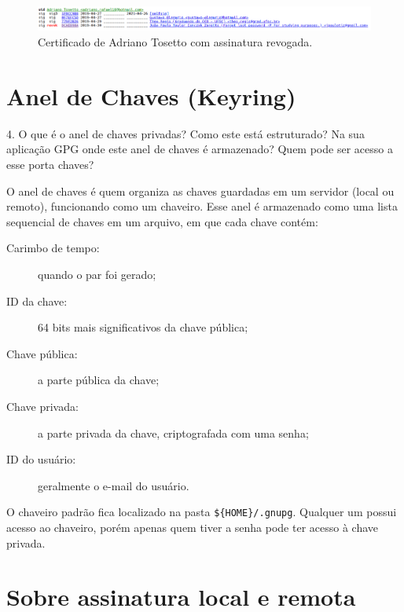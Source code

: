 \documentclass{article}
\begin{document}
    \begin{figure}[h]
        \centering
        \includegraphics[keepaspectratio,width=1\textwidth]{tosetto-revoked-sig}
        \caption{%
            Certificado de Adriano Tosetto com assinatura
            revogada.\label{fig:revokeed-sign}
        }
    \end{figure}

    \section{Anel de Chaves (Keyring)}

    \begin{superframe}
        4. O que é o anel de chaves privadas? Como este está estruturado? Na
        sua aplicação GPG onde este anel de chaves é armazenado? Quem pode ser
        acesso a esse porta chaves?
    \end{superframe}

    O anel de chaves é quem organiza as chaves guardadas em um servidor (local
    ou remoto), funcionando como um chaveiro. Esse anel é armazenado como uma
    lista sequencial de chaves em um arquivo, em que cada chave contém:
    
    \begin{description}
        \item[Carimbo de tempo:] quando o par foi gerado;
        \item[ID da chave:] 64 bits mais significativos da chave pública;
        \item[Chave pública:] a parte pública da chave;
        \item[Chave privada:] a parte privada da chave, criptografada com uma senha;
        \item[ID do usuário:] geralmente o e-mail do usuário.
    \end{description}
    
    O chaveiro padrão fica localizado na pasta \texttt{\$\{HOME\}/.gnupg}.
    Qualquer um possui acesso ao chaveiro, porém apenas quem tiver a senha pode
    ter acesso à chave privada.

    \section{Sobre assinatura local e remota}
\end{document}
